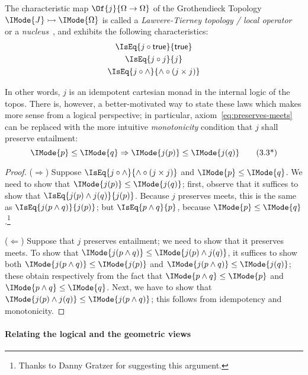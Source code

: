 \documentclass{article}
\newcommand\Mono[2]{#1\rightarrowtail{#2}}
\newcommand\True{\mathsf{true}}
\newcommand\Entails[2]{\IMode{#1}\leq\IMode{#2}}
\begin{document}
\begin{definition}\label{def:lawvere-tierney}
The characteristic map $\Of{j}{\Omega\to\Omega}$ of the Grothendieck
Topology $\Mono{\IMode{J}}{\IMode{\Omega}}$ is called a
\emph{Lawvere-Tierney topology / local
  operator}~\cite{maclane-moerdijk:1992} or a
\emph{nucleus}~\cite{jacobs:1999}, and exhibits the following
characteristics:
\begin{gather}
  \IsEq{j\circ\True}{\True}
  \label{eq:preserves-true}
  \\
  \IsEq{j\circ j}{j}
  \label{eq:idempotency}
  \\
  \IsEq{j\circ\land}{\land\circ(j\times j)}
  \label{eq:preserves-meets}
\end{gather}
\end{definition}

In other words, $j$ is an idempotent cartesian monad in the internal
logic of the topos. There is, however, a better-motivated way to state
these laws which makes more sense from a logical perspective; in
particular, axiom~\ref{eq:preserves-meets} can be replaced with the
more intuitive \emph{monotonicity} condition that $j$ shall preserve
entailment:
\begin{equation}
  \Entails{p}{q}\Rightarrow\Entails{j(p)}{j(q)}
  \tag{3.3*}
  \label{eq:monotonicity}
\end{equation}

\begin{proof}
  ($\Rightarrow$) Suppose $\IsEq{j\circ\land}{\land\circ(j\times j)}$
  and $\Entails{p}{q}$. We need to show that $\Entails{j(p)}{j(q)}$;
  first, observe that it suffices to show that
  $\IsEq{j(p)\land j(q)}{j(p)}$. Because $j$ preserves meets, this is
  the same as $\IsEq{j(p\land q)}{j(p)}$; but $\IsEq{p\land q}{p}$,
  because $\Entails{p}{q}$.\footnote{Thanks to Danny Gratzer for
    suggesting this argument.}

  ($\Leftarrow$) Suppose that $j$ preserves entailment; we need to
  show that it preserves meets. To show that
  $\Entails{j(p\land q)}{j(p)\land j(q)}$, it suffices to show both
  $\Entails{j(p\land q)}{j(p)}$ and $\Entails{j(p\land q)}{j(q)}$;
  these obtain respectively from the fact that $\Entails{p\land q}{p}$
  and $\Entails{p\land q}{q}$. Next, we have to show that
  $\Entails{j(p)\land j(q)}{j(p\land q)}$; this follows from
  idempotency and monotonicity.
\end{proof}

\paragraph{Relating the logical and the geometric views}
\end{document}
